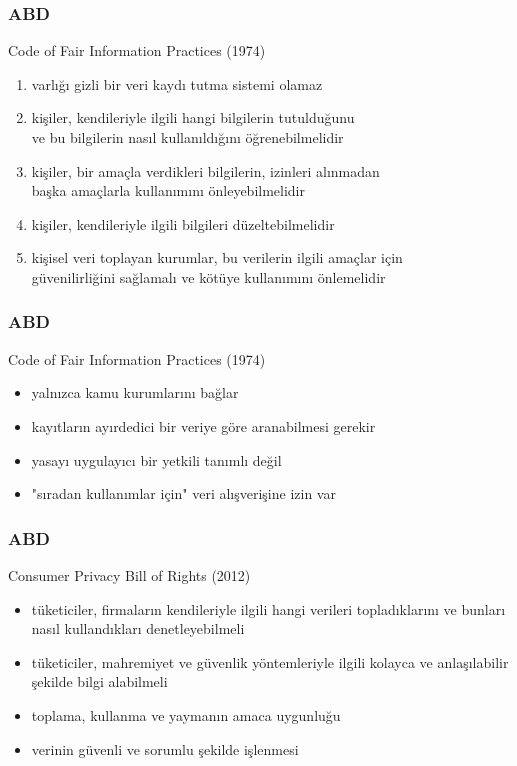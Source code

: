 \documentclass[dvipsnames]{beamer}
\theoremstyle{definition}
\theoremstyle{example}
\theoremstyle{plain}
\begin{document}
\begin{frame}
  \frametitle{ABD}

  \begin{block}{Code of Fair Information Practices (1974)}
    \begin{enumerate}
      \item varlığı gizli bir veri kaydı tutma sistemi olamaz
      \item kişiler, kendileriyle ilgili hangi bilgilerin tutulduğunu\\
        ve bu bilgilerin nasıl kullanıldığını öğrenebilmelidir
      \item kişiler, bir amaçla verdikleri bilgilerin, izinleri alınmadan\\
        başka amaçlarla kullanımını önleyebilmelidir
      \item kişiler, kendileriyle ilgili bilgileri düzeltebilmelidir
      \item kişisel veri toplayan kurumlar, bu verilerin ilgili amaçlar için\\
        güvenilirliğini sağlamalı ve kötüye kullanımını önlemelidir
    \end{enumerate}
  \end{block}
\end{frame}

\begin{frame}
  \frametitle{ABD}

  \begin{block}{Code of Fair Information Practices (1974)}
    \begin{itemize}
      \item yalnızca kamu kurumlarını bağlar
      \item kayıtların ayırdedici bir veriye göre aranabilmesi gerekir
      \item yasayı uygulayıcı bir yetkili tanımlı değil
      \item "sıradan kullanımlar için" veri alışverişine izin var
    \end{itemize}
  \end{block}
\end{frame}

\begin{frame}
  \frametitle{ABD}

  \begin{block}{Consumer Privacy Bill of Rights (2012)}
    \begin{itemize}
      \item tüketiciler, firmaların kendileriyle ilgili hangi verileri
        topladıklarını ve bunları nasıl kullandıkları denetleyebilmeli
      \item tüketiciler, mahremiyet ve güvenlik yöntemleriyle ilgili kolayca
        ve anlaşılabilir şekilde bilgi alabilmeli
      \item toplama, kullanma ve yaymanın amaca uygunluğu
      \item verinin güvenli ve sorumlu şekilde işlenmesi
    \end{itemize}
  \end{block}
\end{frame}
\end{document}

